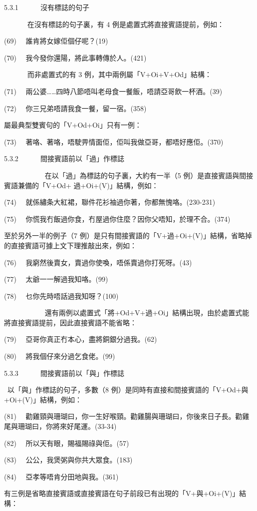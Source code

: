 5.3.1       沒有標誌的句子

       在沒有標誌的句子裏，有 4 例是處置式將直接賓語提前，例如：

(69)   誰肯將女嫁佢個仔呢？(19)

(70)   我今發你還陽，將此事轉傳於人。(421)

       而非處置式的有 3 例，其中兩例屬「V+Oi+V+Od」結構：

(71)   兩公婆……四時八節唔叫老母食一餐飯，唔請亞哥飲一杯酒。(39)

(72)   你三兄弟唔請我食一餐，留一宿。(358)

屬最典型雙賓句的「V+Od+Oi」只有一例：

(73)   著咯、著咯，唔駛畀情面佢，佢叫我做亞哥，都唔好應佢。(370)

5.3.2       間接賓語前以「過」作標誌

            在以「過」為標誌的句子裏，大約有一半（5 例）是直接賓語與間接賓語兼備的「V+Od+ 過+Oi+(V)」結構，例如：

(74)   就係繡条大紅裙，聯件花衫袖過你著，你都無愧咯。(230-231)

(75)   你慌我冇飯過你食，冇屋過你住麼？因你父唔知，於理不合。(374)

至於另外一半的例子（7 例）是只有間接賓語的「V+過+Oi+(V)」結構，省略掉的直接賓語可據上文下理推敲出來，例如：

(76)   我窮然後賣女，賣過你使喚，唔係賣過你打死呀。(43)

(77)   太爺一一解過我知咯。(99)

(78)   乜你先時唔話過我知呀？(100)

            還有兩例以處置式「將+Od+V+過+Oi」結構出現，由於處置式能將直接賓語提前，因此直接賓語不能省略：

(79)   亞哥你真正冇本心，盡將銅銀分過我。(62)

(80)   將我個仔來分過乞食佬。(99)

5.3.3       間接賓語前以「與」作標誌

 以「與」作標誌的句子，多數（8 例）是同時有直接和間接賓語的「V+Od+與+Oi+(V)」結構，例如：

(81)   勸雞頸與珊瑚曰，你一生好喉頸。勸雞腸與珊瑚曰，你後來日子長。勸雞尾與珊瑚曰，你將來好尾運。(33-34)

(82)   所以天有眼，賜福賜祿與佢。(57)

(83)   公公，我煲粥與你共大眾食。(183)

(84)   亞孝等唔肯分田地與我。(361)

有三例是省略直接賓語或直接賓語在句子前段已有出現的「V+與+Oi+(V)」結構：

